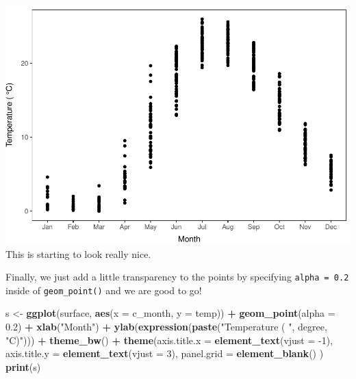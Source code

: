 \documentclass[
]{book}
\newenvironment{Shaded}{\begin{snugshade}}{\end{snugshade}}
\newcommand{\DataTypeTok}[1]{\textcolor[rgb]{0.13,0.29,0.53}{#1}}
\newcommand{\DecValTok}[1]{\textcolor[rgb]{0.00,0.00,0.81}{#1}}
\newcommand{\FloatTok}[1]{\textcolor[rgb]{0.00,0.00,0.81}{#1}}
\newcommand{\KeywordTok}[1]{\textcolor[rgb]{0.13,0.29,0.53}{\textbf{#1}}}
\newcommand{\NormalTok}[1]{#1}
\newcommand{\OperatorTok}[1]{\textcolor[rgb]{0.81,0.36,0.00}{\textbf{#1}}}
\newcommand{\StringTok}[1]{\textcolor[rgb]{0.31,0.60,0.02}{#1}}
\begin{document}
\includegraphics{worstr_files/figure-latex/unnamed-chunk-106-1.pdf}
This is starting to look really nice.

Finally, we just add a little transparency to the points by specifying \texttt{alpha\ =\ 0.2} inside of \texttt{geom\_point()} and we are good to go!

\begin{Shaded}
\begin{Highlighting}[]
\NormalTok{s <-}\StringTok{ }\KeywordTok{ggplot}\NormalTok{(surface, }\KeywordTok{aes}\NormalTok{(}\DataTypeTok{x =}\NormalTok{ c_month, }\DataTypeTok{y =}\NormalTok{ temp)) }\OperatorTok{+}
\StringTok{  }\KeywordTok{geom_point}\NormalTok{(}\DataTypeTok{alpha =} \FloatTok{0.2}\NormalTok{) }\OperatorTok{+}\StringTok{ }
\StringTok{  }\KeywordTok{xlab}\NormalTok{(}\StringTok{"Month"}\NormalTok{) }\OperatorTok{+}
\StringTok{  }\KeywordTok{ylab}\NormalTok{(}\KeywordTok{expression}\NormalTok{(}\KeywordTok{paste}\NormalTok{(}\StringTok{"Temperature ( "}\NormalTok{, degree, }\StringTok{"C)"}\NormalTok{))) }\OperatorTok{+}
\StringTok{  }\KeywordTok{theme_bw}\NormalTok{() }\OperatorTok{+}
\StringTok{  }\KeywordTok{theme}\NormalTok{(}\DataTypeTok{axis.title.x =} \KeywordTok{element_text}\NormalTok{(}\DataTypeTok{vjust =} \DecValTok{-1}\NormalTok{),}
        \DataTypeTok{axis.title.y =} \KeywordTok{element_text}\NormalTok{(}\DataTypeTok{vjust =} \DecValTok{3}\NormalTok{),}
        \DataTypeTok{panel.grid =} \KeywordTok{element_blank}\NormalTok{()}
\NormalTok{  )}
\KeywordTok{print}\NormalTok{(s)}
\end{Highlighting}
\end{Shaded}
\end{document}
